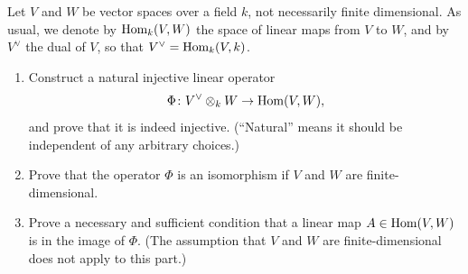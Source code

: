 \begin{question}[subtitle = January 2022 Problem 4,ID=Jan22_4]
Let $V$ and $W$ be vector spaces over a field $k$, not necessarily finite dimensional. As usual, we denote by $\operatorname{Hom}_k(V,W)$ the space of linear maps from $V$ to $W$, and by $V^\vee$ the dual of $V$, so that $V^\vee = \operatorname{Hom}_k(V,k)$.
\begin{enumerate}
    \item Construct a natural injective linear operator
    \[\Phi\colon V^\vee \otimes_k W \to \operatorname{Hom}(V,W),\]
    and prove that it is indeed injective. (``Natural'' means it should be independent of any arbitrary choices.)
    \item Prove that the operator $\Phi$ is an isomorphism if $V$ and $W$ are finite-dimensional.
    \item Prove a necessary and sufficient condition that a linear map $A \in \operatorname{Hom}(V,W)$ is in the image of $\Phi$. (The assumption that $V$ and $W$ are finite-dimensional does not apply to this part.)
\end{enumerate}
\end{question}
